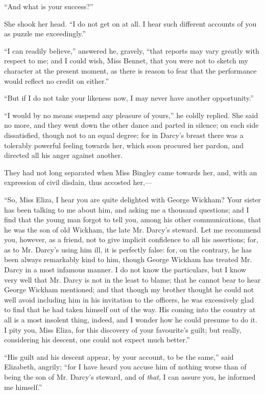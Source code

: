 \documentclass[12pt]{book}
\begin{document}
``And what is your success?''

She shook her head. ``I do not get on at all. I hear such different accounts of you as puzzle me exceedingly.''

``I can readily believe,'' answered he, gravely, ``that reports may vary greatly with respect to me; and I could wish, Miss Bennet, that you were not to sketch my character at the present moment, as there is reason to fear that the performance would reflect no credit on either.''

``But if I do not take your likeness now, I may never have another opportunity.''

``I would by no means suspend any pleasure of yours,'' he coldly replied. She said no more, and they went down the other dance and parted in silence; on each side dissatisfied, though not to an equal degree; for in Darcy's breast there was a tolerably powerful feeling towards her, which soon procured her pardon, and directed all his anger against another.

They had not long separated when Miss Bingley came towards her, and, with an expression of civil disdain, thus accosted her,---

``So, Miss Eliza, I hear you are quite delighted with George Wickham? Your sister has been talking to me about him, and asking me a thousand questions; and I find that the young man forgot to tell you, among his other communications, that he was the son of old Wickham, the late Mr. Darcy's steward. Let me recommend you, however, as a friend, not to give implicit confidence to all his assertions; for, as to Mr. Darcy's using him ill, it is perfectly false: for, on the contrary, he has been always remarkably kind to him, though George Wickham has treated Mr. Darcy in a most infamous manner. I do not know the particulars, but I know very well that Mr. Darcy is not in the least to blame; that he cannot bear to hear George Wickham mentioned; and that though my brother thought he could not well avoid including him in his invitation to the officers, he was excessively glad to find that he had taken himself out of the way. His coming into the country at all is a most insolent thing, indeed, and I wonder how he could presume to do it. I pity you, Miss Eliza, for this discovery of your favourite's guilt; but really, considering his descent, one could not expect much better.''

``His guilt and his descent appear, by your account, to be the same,'' said Elizabeth, angrily; ``for I have heard you accuse him of nothing worse than of being the son of Mr. Darcy's steward, and of \textit{that}, I can assure you, he informed me himself.''
\end{document}
